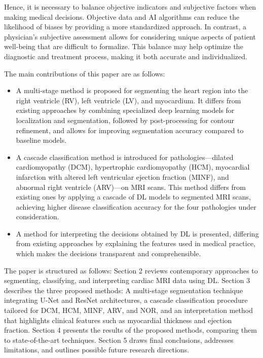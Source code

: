 \documentclass[fleqn,10pt]{wlscirep}
\begin{document}
Hence, it is necessary to balance objective indicators and subjective factors when making medical decisions. Objective data and AI algorithms can reduce the likelihood of biases by providing a more standardized approach. In contrast, a physician’s subjective assessment allows for considering unique aspects of patient well-being that are difficult to formalize. This balance may help optimize the diagnostic and treatment process, making it both accurate and individualized.

The main contributions of this paper are as follows:

\begin{itemize}
    \item A multi-stage method is proposed for segmenting the heart region into the right ventricle (RV), left ventricle (LV), and myocardium. It differs from existing approaches by combining specialized deep learning models for localization and segmentation, followed by post-processing for contour refinement, and allows for improving segmentation accuracy compared to baseline models.
    \item A cascade classification method is introduced for pathologies—dilated cardiomyopathy (DCM), hypertrophic cardiomyopathy (HCM), myocardial infarction with altered left ventricular ejection fraction (MINF), and abnormal right ventricle (ARV)—on MRI scans. This method differs from existing ones by applying a cascade of DL models to segmented MRI scans, achieving higher disease classification accuracy for the four pathologies under consideration.
    \item A method for interpreting the decisions obtained by DL is presented, differing from existing approaches by explaining the features used in medical practice, which makes the decisions transparent and comprehensible.
\end{itemize}

The paper is structured as follows: Section 2 reviews contemporary approaches to segmenting, classifying, and interpreting cardiac MRI data using DL. Section 3 describes the three proposed methods: A multi-stage segmentation technique integrating U-Net and ResNet architectures, a cascade classification procedure tailored for DCM, HCM, MINF, ARV, and NOR, and an interpretation method that highlights clinical features such as myocardial thickness and ejection fraction. Section 4 presents the results of the proposed methods, comparing them to state-of-the-art techniques. Section 5 draws final conclusions, addresses limitations, and outlines possible future research directions.
\end{document}
